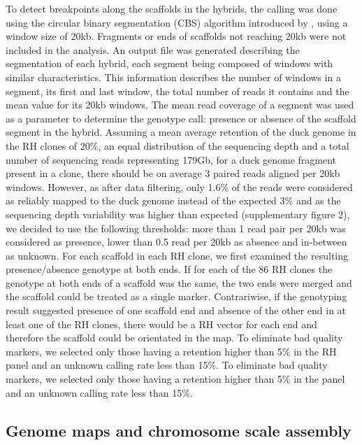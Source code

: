 \documentclass[10pt,letterpaper]{article}
\begin{document}
To detect breakpoints along the scaffolds in the hybrids, the calling was done using the circular binary segmentation (CBS) algorithm introduced by \cite{Olshen2004}, using a window size of 20kb. Fragments or ends of scaffolds not reaching 20kb were not included in the analysis. An output file was generated describing the segmentation of each hybrid, each segment being composed of windows with similar characteristics. This information describes the number of windows in a segment, its first and last window, the total number of reads it contains and the mean value for its 20kb windows. The mean read coverage of a segment was used as a parameter to determine the genotype call: presence or absence of the scaffold segment in the hybrid. Assuming a mean average retention of the duck genome in the RH clones of  20\%, an equal distribution of the sequencing depth and a total number of sequencing reads representing 179Gb, for a duck genome fragment present in a clone, there should be on average 3 paired reads aligned per 20kb windows. However, as after data filtering, only 1.6\% of the reads were considered as reliably mapped to the duck genome instead of the expected 3\% and as the sequencing depth variability was higher than expected (supplementary figure 2), we decided to use the following thresholds: more than 1 read pair per 20kb was considered as presence, lower than 0.5 read per 20kb as absence and in-between as unknown. For each scaffold in each RH clone, we first examined the resulting presence/absence genotype at both ends. If for each of the 86 RH clones the genotype at both ends of a scaffold was the same, the two ends were merged and the scaffold could be treated as a single marker. Contrariwise, if the genotyping result suggested presence of one scaffold end and absence of the other end in at least one of the RH clones, there would be a RH vector for each end and therefore the scaffold could be orientated in the map. To eliminate bad quality markers, we selected only those having a retention higher than 5\% in the RH panel and an unknown calling rate less than 15\%. 
To eliminate bad quality markers, we selected only those having a retention higher than 5\% in the panel and an unknown calling rate less than 15\%. 

\subsection*{Genome maps and chromosome scale assembly}
\end{document}

